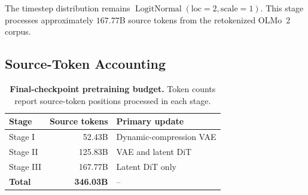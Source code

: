 The timestep distribution remains $\operatorname{LogitNormal}(\mathrm{loc}=2,\mathrm{scale}=1)$. This stage processes approximately $167.77$B source tokens from the retokenized OLMo~2 corpus.

\subsection{Source-Token Accounting}

\begin{table}[H]
    \centering
    \caption{\textbf{Final-checkpoint pretraining budget.} Token counts report source-token positions processed in each stage.}
    \label{tab:final-pretraining-budget}
    \small
    \setlength{\tabcolsep}{10pt}
    \begin{tabular}{lrl}
        \toprule
        \textbf{Stage} & \textbf{Source tokens} & \textbf{Primary update} \\
        \midrule
        Stage I   & 52.43B  & Dynamic-compression VAE \\
        Stage II  & 125.83B & VAE and latent DiT \\
        Stage III & 167.77B & Latent DiT only \\
        \midrule
        \textbf{Total} & \textbf{346.03B} & -- \\
        \bottomrule
    \end{tabular}
\end{table}
